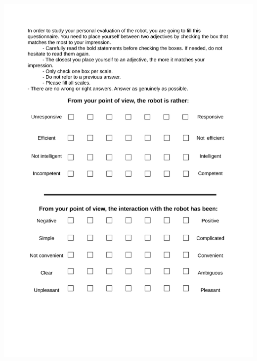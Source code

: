 \begin{center}
\includegraphics[page=2, width=\textwidth]{Annexes/perdita_translation_en_thesis.pdf} 
\end{center}

